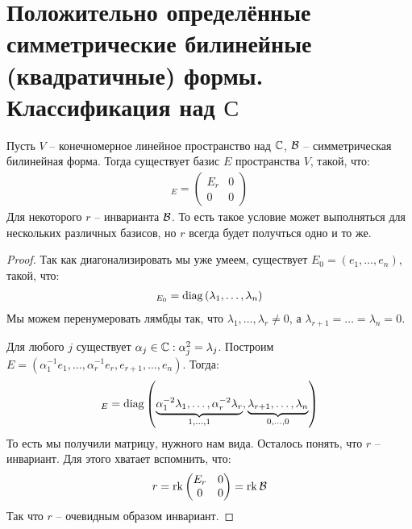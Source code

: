 \section{Положительно определённые симметрические билинейные (квадратичные) формы. Классификация над $С$}
\begin{theorem-non}
    Пусть $V$ -- конечномерное линейное пространство над $\mathbb{C}$, $\mathcal{B}$ -- симметрическая билинейная форма. Тогда существует 
    базис $E$ пространства $V$, такой, что: 
    \begin{gather*}
        [\B]_E = \begin{pmatrix*}
            E_r & 0 \\
            0 & 0
        \end{pmatrix*} 
    \end{gather*} 
    Для некоторого $r$ -- инварианта $\mathcal{B}$. То есть такое условие может выполняться для нескольких различных базисов, но $r$ всегда будет получться одно и то же. 
\end{theorem-non}
\begin{proof}
    Так как диагонализировать мы уже умеем, существует $E_0 = (e_1, \dots, e_n)$, такой, что: 
    \begin{gather*}
        [\B]_{E_0} = \diag{\lambda_1, \dots, \lambda_n}
    \end{gather*}
    Мы можем перенумеровать лямбды так, что $\lambda_1, \dots, \lambda_r \neq 0$, а $\lambda_{r+1} = \dots = \lambda_n = 0$. 

    Для любого $j$ существует $\alpha_j \in \mathbb{C} : \alpha_j^2 = \lambda_j$. 
    Построим $E = (\alpha^{-1}_1 e_1, \dots, \alpha^{-1}_r e_r, e_{r+1}, \dots, e_n)$. 
    Тогда: 
    \begin{gather*}
        [\B]_E = \diag{\underbrace{\alpha_1^{-2} \lambda_1, \dots, \alpha_r^{-2} \lambda_r}_{1, \dots, 1}, \underbrace{\lambda_{r+1}, \dots, \lambda_n}_{0, \dots, 0}}
    \end{gather*}
    То есть мы получили матрицу, нужного нам вида. Осталось понять, что $r$ -- инвариант. Для этого хватает вспомнить, что: 
    \begin{gather*}
        r = \rk{\begin{pmatrix*}
            E_r & 0 \\
            0 & 0
        \end{pmatrix*}} = \rk{\B}
    \end{gather*}
    Так что $r$ -- очевидным образом инвариант. 
\end{proof}